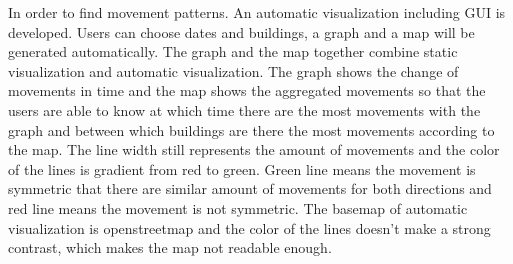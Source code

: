 In order to find movement patterns. An automatic visualization including GUI is developed. Users can choose dates and buildings, a graph and a map will be generated automatically. The graph and the map together combine static visualization and automatic visualization. The graph shows the change of movements in time and the map shows the aggregated movements so that the users are able to know at which time there are the most movements with the graph and between which buildings are there the most movements according to the map. The line width still represents the amount of movements and the color of the lines is gradient from red to green. Green line means the movement is symmetric that there are similar amount of movements for both directions and red line means the movement is not symmetric. The basemap of automatic visualization is openstreetmap and the color of the lines doesn't make a strong contrast, which makes the map not readable enough.
